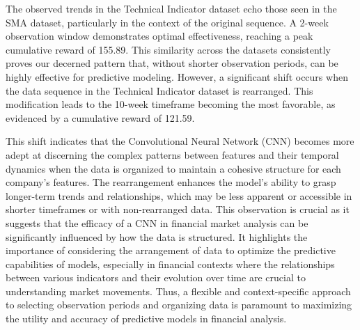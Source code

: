 The observed trends in the Technical Indicator dataset echo those seen in the SMA dataset, particularly in the context of the original sequence. A 2-week observation window demonstrates optimal effectiveness, reaching a peak cumulative reward of 155.89. This similarity across the datasets consistently proves our decerned pattern that, without shorter observation periods, can be highly effective for predictive modeling. However, a significant shift occurs when the data sequence in the Technical Indicator dataset is rearranged. This modification leads to the 10-week timeframe becoming the most favorable, as evidenced by a cumulative reward of 121.59.

This shift indicates that the Convolutional Neural Network (CNN) becomes more adept at discerning the complex patterns between features and their temporal dynamics when the data is organized to maintain a cohesive structure for each company's features. The rearrangement enhances the model's ability to grasp longer-term trends and relationships, which may be less apparent or accessible in shorter timeframes or with non-rearranged data. This observation is crucial as it suggests that the efficacy of a CNN in financial market analysis can be significantly influenced by how the data is structured. It highlights the importance of considering the arrangement of data to optimize the predictive capabilities of models, especially in financial contexts where the relationships between various indicators and their evolution over time are crucial to understanding market movements. Thus, a flexible and context-specific approach to selecting observation periods and organizing data is paramount to maximizing the utility and accuracy of predictive models in financial analysis.